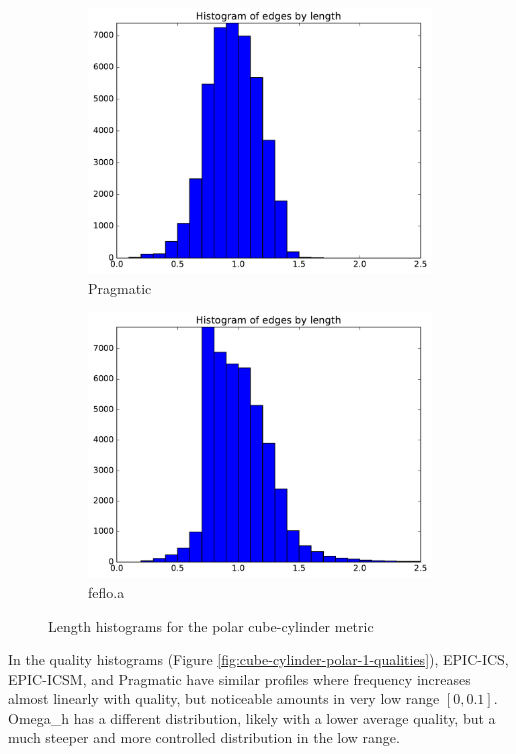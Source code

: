 \documentclass[3p,times,procedia,number]{elsarticle}
\begin{document}
\begin{figure}
\begin{subfigure}{.16\textwidth}
\includegraphics[width=\textwidth]{pragmatic-cube-cylinder-polar-1-length.pdf}
\caption{Pragmatic}
\end{subfigure}
\begin{subfigure}{.16\textwidth}
\centering
\includegraphics[width=\textwidth]{fefloa-cube-cylinder-polar-1-length.pdf}
\caption{feflo.a}
\end{subfigure}
\caption{Length histograms for the polar cube-cylinder metric}
\label{fig:cube-cylinder-polar-1-lengths}
\end{figure}

In the quality histograms (Figure \ref{fig:cube-cylinder-polar-1-qualities}),
EPIC-ICS, EPIC-ICSM, and Pragmatic have similar
profiles where frequency increases almost linearly with quality, but noticeable
amounts in very low range $[0,0.1]$.
Omega\_h has a different distribution, likely with a lower average quality,
but a much steeper and more controlled distribution in the low range.
\end{document}
